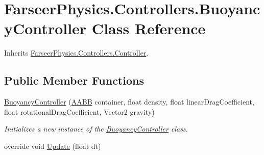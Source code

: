 \hypertarget{class_farseer_physics_1_1_controllers_1_1_buoyancy_controller}{\section{Farseer\+Physics.\+Controllers.\+Buoyancy\+Controller Class Reference}
\label{class_farseer_physics_1_1_controllers_1_1_buoyancy_controller}
}


Inherits \hyperlink{class_farseer_physics_1_1_controllers_1_1_controller}{Farseer\+Physics.\+Controllers.\+Controller}.

\subsection*{Public Member Functions}
\begin{DoxyCompactItemize}
\item 
\hyperlink{class_farseer_physics_1_1_controllers_1_1_buoyancy_controller_a0bbd38a53c786f63e77feea9782dca54}{Buoyancy\+Controller} (\hyperlink{struct_farseer_physics_1_1_collision_1_1_a_a_b_b}{A\+A\+B\+B} container, float density, float linear\+Drag\+Coefficient, float rotational\+Drag\+Coefficient, Vector2 gravity)
\begin{DoxyCompactList}\small\item\em Initializes a new instance of the \hyperlink{class_farseer_physics_1_1_controllers_1_1_buoyancy_controller}{Buoyancy\+Controller} class. \end{DoxyCompactList}\item 
override void \hyperlink{class_farseer_physics_1_1_controllers_1_1_buoyancy_controller_ae897d6e7ac2783645da0bcd12ae7b94f}{Update} (float dt)
\end{DoxyCompactItemize}
